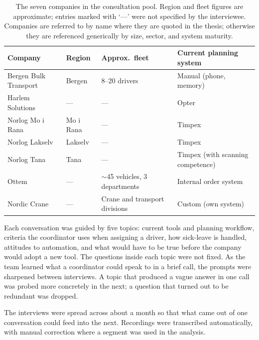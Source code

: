 \begin{table}[h]
\centering
\caption{The seven companies in the consultation pool. Region and fleet figures are approximate; entries marked with `---' were not specified by the interviewee. Companies are referred to by name where they are quoted in the thesis; otherwise they are referenced generically by size, sector, and system maturity.}
\label{tab:companies}
\small
\begin{tabular}{p{}p{}p{}p{}}
\toprule
\textbf{Company} & \textbf{Region} & \textbf{Approx.\ fleet} & \textbf{Current planning system} \\
\midrule
Bergen Bulk Transport & Bergen     & 8--20 drivers                    & Manual (phone, memory)            \\
Harlem Solutions      & ---        & ---                              & Opter                             \\
Norlog Mo i Rana      & Mo i Rana  & ---                              & Timpex                            \\
Norlog Lakselv        & Lakselv    & ---                              & Timpex                            \\
Norlog Tana           & Tana       & ---                              & Timpex (with scanning competence) \\
Ottem                 & ---        & $\sim$45 vehicles, 3 departments & Internal order system             \\
Nordic Crane          & ---        & Crane and transport divisions    & Custom (own system)               \\
\bottomrule
\end{tabular}
\end{table}

Each conversation was guided by five topics: current tools and planning workflow, criteria the coordinator uses when assigning a driver, how sick-leave is handled, attitudes to automation, and what would have to be true before the company would adopt a new tool. The questions inside each topic were not fixed. As the team learned what a coordinator could speak to in a brief call, the prompts were sharpened between interviews. A topic that produced a vague answer in one call was probed more concretely in the next; a question that turned out to be redundant was dropped.

The interviews were spread across about a month so that what came out of one conversation could feed into the next. Recordings were transcribed automatically, with manual correction where a segment was used in the analysis.


